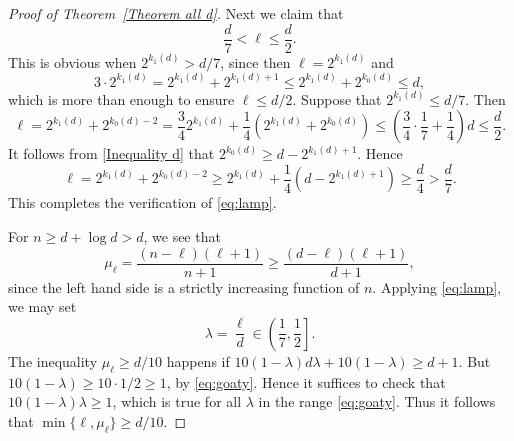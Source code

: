 \documentclass[11pt, reqno]{amsart}
\numberwithin{equation}{section}
\renewcommand{\leq}{\leqslant}
\renewcommand{\geq}{\geqslant}
\begin{document}
\begin{proof}[Proof of Theorem~\ref{Theorem all d}]
Next we claim that 
\begin{equation}\label{eq:lamp}
\frac{d}{7}<\ell \leq \frac{d}{2}.
\end{equation}
This is obvious when   $2^{k_1(d)} > d/7$, since then  
$\ell =2^{k_1(d)}$ and
$$
3\cdot 2^{k_1(d)}=2^{k_1(d)} +2^{k_1(d)+1}\leq 
2^{k_1(d)} +2^{k_0(d)}\leq d,
$$
which is more than enough to ensure $\ell\leq d/2$.
Suppose that 
$2^{k_1(d)} \leq  d/7$. Then 
$$
\ell=2^{k_1(d)} + 2^{k_0(d)-2}=\frac{3}{4}2^{k_1(d)} +\frac{1}{4}\left(2^{k_1(d)}+2^{k_0(d)}\right) 
\leq \left(\frac{3}{4}\cdot \frac{1}{7} +\frac{1}{4}\right)d \leq \frac{d}{2}.
$$
It follows from  \eqref{Inequality d} 
that $2^{k_0(d)}\geq d-2^{k_1(d)+1}$. Hence
$$
\ell=2^{k_1(d)} + 2^{k_0(d)-2}\geq 2^{k_1(d)} +\frac{1}{4}\left(d-2^{k_1(d)+1}\right) 
\geq \frac{d}{4}>\frac{d}{7}.
$$
This completes the verification of \eqref{eq:lamp}.



For $n\geq d+\log d> d$, we see that 
$$
\mu_\ell=\frac{(n-\ell)(\ell+1)}{n+1}\geq \frac{(d-\ell)(\ell+1)}{d+1},
$$
since the left hand side is  a strictly increasing function of $n$. 
Applying \eqref{eq:lamp}, we may set
\begin{equation}\label{eq:goaty}
\lambda = \frac{\ell}{d} \in  \left(\frac{1}{7}, \frac{1}{2}\right].
\end{equation}
The inequality  $\mu_\ell\geq d/10$ happens if 
$10(1-\lambda)d\lambda +10(1-\lambda)\geq d+1$.
But $10(1-\lambda)\geq 10\cdot 1/2\geq 1$, by \eqref{eq:goaty}.  
Hence it suffices to check that 
$10(1-\lambda)\lambda \geq 1$, which is true for all $\lambda$ in the range \eqref{eq:goaty}.
Thus it follows that 
$\min\{\ell,\mu_\ell\}\geq d/10$. 


\end{proof}
\end{document}
